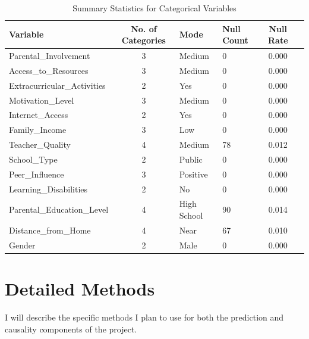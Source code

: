\documentclass[11pt]{article}
\begin{document}
\begin{table}[H]
\centering
\caption{Summary Statistics for Categorical Variables}
\label{tab:categorical_summary}
\begin{tabularx}{\textwidth}{l c X l c c}
\toprule
Variable & No. of Categories  & Mode & Null Count & Null Rate \\
\midrule
Parental\_Involvement      & 3                     & Medium      & 0  & 0.000 \\
Access\_to\_Resources      & 3                   & Medium      & 0  & 0.000 \\
Extracurricular\_Activities& 2                            & Yes         & 0  & 0.000 \\
Motivation\_Level          & 3                    & Medium      & 0  & 0.000 \\
Internet\_Access           & 2                            & Yes         & 0  & 0.000 \\
Family\_Income             & 3                   & Low         & 0  & 0.000 \\
Teacher\_Quality           & 4                    & Medium      & 78 & 0.012 \\
School\_Type               & 2                      & Public      & 0  & 0.000 \\
Peer\_Influence            & 3          & Positive    & 0  & 0.000 \\
Learning\_Disabilities     & 2                             & No          & 0  & 0.000 \\
Parental\_Education\_Level & 4   & High School & 90 & 0.014 \\
Distance\_from\_Home       & 4                & Near        & 67 & 0.010 \\
Gender                     & 2                        & Male        & 0  & 0.000 \\
\bottomrule
\end{tabularx}
\end{table}

\section{Detailed Methods}
I will describe the specific methods I plan to use for both the prediction and causality components of the project.
\end{document}
